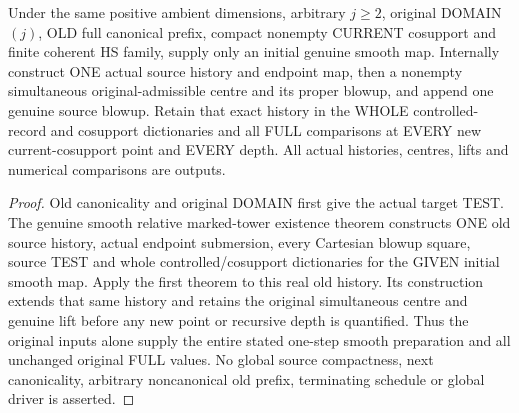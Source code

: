 \begin{theorem}
\label{hir:original-compact-prepared-all-bounds-smooth-history}
\leanok
Under the same positive ambient dimensions, arbitrary $j\geq2$, original
DOMAIN$(j)$, OLD full canonical prefix, compact nonempty CURRENT cosupport
and finite coherent HS family, supply only an initial genuine smooth map.
Internally construct ONE actual source history and endpoint map, then a
nonempty simultaneous original-admissible centre and its proper blowup,
and append one genuine source blowup. Retain that exact history in the
WHOLE controlled-record and cosupport dictionaries and all FULL comparisons
at EVERY new current-cosupport point and EVERY depth. All actual histories,
centres, lifts and numerical comparisons are outputs.
\end{theorem}
\begin{proof}
Old canonicality and original DOMAIN first give the actual target TEST.
The genuine smooth relative marked-tower existence theorem constructs ONE
old source history, actual endpoint submersion, every Cartesian blowup
square, source TEST and whole controlled/cosupport dictionaries for the
GIVEN initial smooth map. Apply the first theorem to this real old history.
Its construction extends that same history and retains the original
simultaneous centre and genuine lift before any new point or recursive
depth is quantified. Thus the original inputs alone supply the entire
stated one-step smooth preparation and all unchanged original FULL values.
No global source compactness, next canonicality, arbitrary noncanonical
old prefix, terminating schedule or global driver is asserted.
\end{proof}
